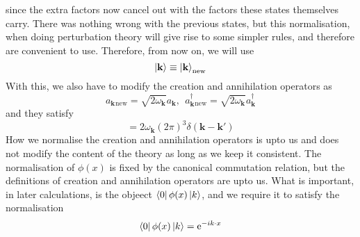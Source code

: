 \documentclass[11pt, notitlepage]{report}
\newcommand{\e}{\mathrm{e}}
\newcommand{\w}{\omega}
\renewcommand{\a}[1]{a_\mathbf{#1}}
\newcommand{\adag}[1]{a^\dagger_\mathbf{#1}}
\numberwithin{equation}{section}
\begin{document}
    since the extra factors now cancel out with the factors these states themselves carry. There was nothing wrong with the previous states, but this normalisation, when doing perturbation theory will give rise to some simpler rules, and therefore are convenient to use. Therefore, from now on, we will use 
    \begin{equation*}
        \ket{\textbf{k}}\equiv \ket{\textbf{k}}_{\text{new}}
    \end{equation*}
    With this, we also have to modify the creation and annihilation operators as 
    \begin{equation*}
        \a{k}{}_\text{new} = \sqrt{2\w_\textbf{k}}\a{k},~~\adag{k}{}_\text{new} = \sqrt{2\w_\textbf{k}}\adag{k}
    \end{equation*}
    and they satisfy
    \begin{equation*}
        [\a{k}{}_{\text{new}}, \adag{k}{}_{\text{new}}] = 2\w_\textbf{k} (2\pi)^3\delta(\textbf{k} - \textbf{k}')
    \end{equation*}
    How we normalise the creation and annihilation operators is upto us and does not modify the content of the theory as long as we keep it consistent. The normalisation of \(\phi(x)\) is fixed by the canonical commutation relation, but the definitions of creation and annihilation operators are upto us. What is important, in later calculations, is the objeect \(\bra{0}\phi(x)\ket{k}\), and we require it to satisfy the normalisation 
    \begin{equation*}
        \bra{0}\phi(x)\ket{k} = \e^{-ik\cdot x} 
    \end{equation*}
\end{document}
